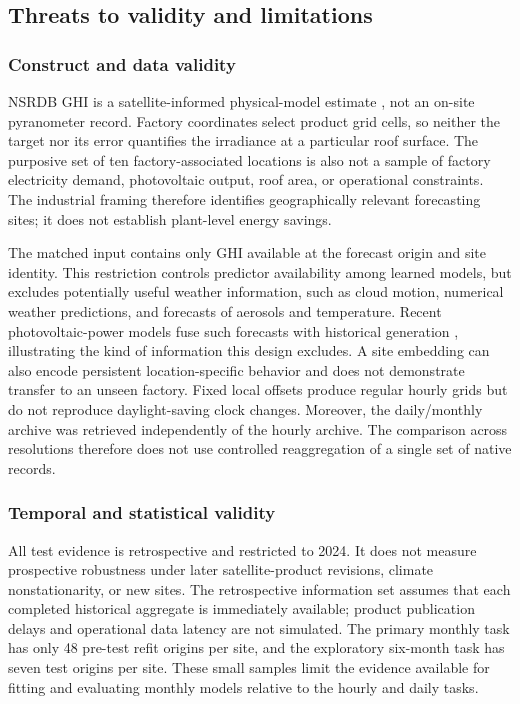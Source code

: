 \subsection{Threats to validity and limitations}
\label{sec:limitations}

\subsubsection{Construct and data validity}

NSRDB GHI is a satellite-informed physical-model estimate
\cite{sengupta2018}, not an on-site pyranometer record. Factory coordinates
select product grid cells, so neither the target nor its error quantifies the
irradiance at a particular roof surface. The purposive set of ten
factory-associated locations is also not a sample of factory electricity
demand, photovoltaic output, roof area, or operational constraints. The
industrial framing therefore identifies geographically relevant forecasting
sites; it does not establish plant-level energy savings.

The matched input contains only GHI available at the forecast origin and
site identity. This restriction controls predictor availability among learned
models, but excludes potentially useful weather information, such as cloud
motion, numerical weather predictions, and forecasts of aerosols and
temperature. Recent photovoltaic-power models fuse such forecasts with
historical generation \cite{zhang2026rethinking}, illustrating the kind of
information this design excludes. A site embedding can also encode persistent
location-specific behavior and does not demonstrate transfer to an unseen
factory. Fixed local offsets produce regular hourly grids but do not reproduce
daylight-saving clock changes. Moreover, the daily/monthly archive was
retrieved independently of the hourly archive. The comparison across resolutions
therefore does not use controlled reaggregation of a single set of native
records.

\subsubsection{Temporal and statistical validity}

All test evidence is retrospective and restricted to 2024. It does not measure
prospective robustness under later satellite-product revisions, climate
nonstationarity, or new sites. The retrospective information set assumes
that each completed historical aggregate is immediately available; product
publication delays and operational data latency are not simulated. The
primary monthly task has only 48 pre-test refit origins per site, and the
exploratory six-month task has seven test origins per site. These small
samples limit the evidence available for fitting and evaluating monthly
models relative to the hourly and daily tasks.

